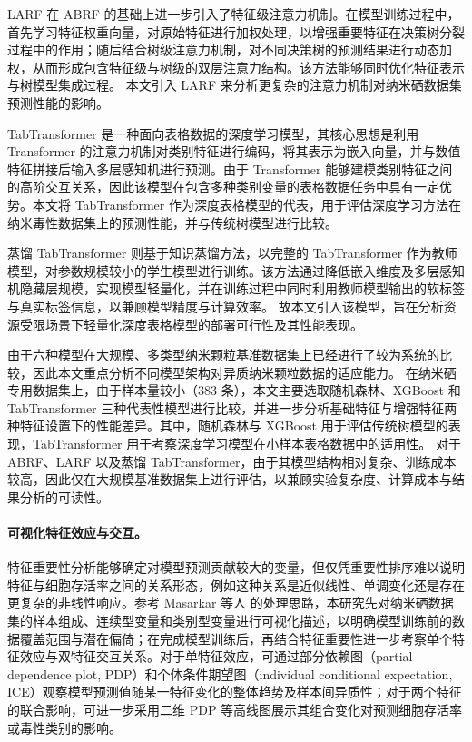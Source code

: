 LARF 在 ABRF 的基础上进一步引入了特征级注意力机制。在模型训练过程中，首先学习特征权重向量，对原始特征进行加权处理，以增强重要特征在决策树分裂过程中的作用；随后结合树级注意力机制，对不同决策树的预测结果进行动态加权，从而形成包含特征级与树级的双层注意力结构。该方法能够同时优化特征表示与树模型集成过程。
本文引入 LARF 来分析更复杂的注意力机制对纳米硒数据集预测性能的影响。

TabTransformer 是一种面向表格数据的深度学习模型，其核心思想是利用 Transformer 的注意力机制对类别特征进行编码，将其表示为嵌入向量，并与数值特征拼接后输入多层感知机进行预测。由于 Transformer 能够建模类别特征之间的高阶交互关系，因此该模型在包含多种类别变量的表格数据任务中具有一定优势。本文将 TabTransformer 作为深度表格模型的代表，用于评估深度学习方法在纳米毒性数据集上的预测性能，并与传统树模型进行比较。

蒸馏 TabTransformer 则基于知识蒸馏方法，以完整的 TabTransformer 作为教师模型，对参数规模较小的学生模型进行训练。该方法通过降低嵌入维度及多层感知机隐藏层规模，实现模型轻量化，并在训练过程中同时利用教师模型输出的软标签与真实标签信息，以兼顾模型精度与计算效率。
故本文引入该模型，旨在分析资源受限场景下轻量化深度表格模型的部署可行性及其性能表现。

由于六种模型在大规模、多类型纳米颗粒基准数据集上已经进行了较为系统的比较，因此本文重点分析不同模型架构对异质纳米颗粒数据的适应能力。
在纳米硒专用数据集上，由于样本量较小（383 条），本文主要选取随机森林、XGBoost 和 TabTransformer 三种代表性模型进行比较，并进一步分析基础特征与增强特征两种特征设置下的性能差异。其中，随机森林与 XGBoost 用于评估传统树模型的表现，TabTransformer 用于考察深度学习模型在小样本表格数据中的适用性。
对于 ABRF、LARF 以及蒸馏 TabTransformer，由于其模型结构相对复杂、训练成本较高，因此仅在大规模基准数据集上进行评估，以兼顾实验复杂度、计算成本与结果分析的可读性。

\paragraph{可视化特征效应与交互。}
特征重要性分析能够确定对模型预测贡献较大的变量，但仅凭重要性排序难以说明特征与细胞存活率之间的关系形态，例如这种关系是近似线性、单调变化还是存在更复杂的非线性响应。参考 Masarkar 等人 \cite{masarkar2024} 的处理思路，本研究先对纳米硒数据集的样本组成、连续型变量和类别型变量进行可视化描述，以明确模型训练前的数据覆盖范围与潜在偏倚；在完成模型训练后，再结合特征重要性进一步考察单个特征效应与双特征交互关系。对于单特征效应，可通过部分依赖图（partial dependence plot, PDP）和个体条件期望图（individual conditional expectation, ICE）观察模型预测值随某一特征变化的整体趋势及样本间异质性；对于两个特征的联合影响，可进一步采用二维 PDP 等高线图展示其组合变化对预测细胞存活率或毒性类别的影响。

